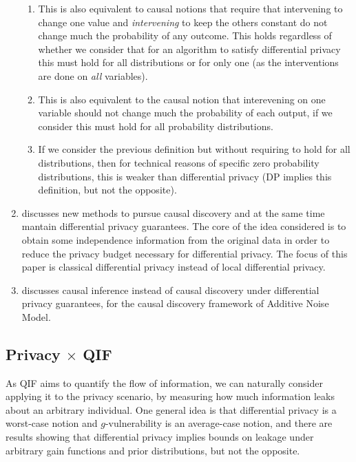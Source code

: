 \begin{enumerate}
\begin{enumerate}
    \item This is also equivalent to causal notions that require that intervening to change one value and \emph{intervening} to keep the others constant do not change much the probability of any outcome. This holds regardless of whether we consider that for an algorithm to satisfy differential privacy this must hold for all distributions or for only one (as the interventions are done on \emph{all} variables).
    \item This is also equivalent to the causal notion that interevening on one variable should not change much the probability of each output, if we consider this must hold for all probability distributions.
    \item If we consider the previous definition but without requiring to hold for all distributions, then for technical reasons of specific zero probability distributions, this is weaker than differential privacy (DP implies this definition, but not the opposite).
    \end{enumerate}
\item \cite{xu2017differential} discusses new methods to pursue causal discovery and at the same time mantain differential privacy guarantees. The core of the idea considered is to obtain some independence information from the original data in order to reduce the privacy budget necessary for differential privacy. The focus of this paper is classical differential privacy instead of local differential privacy.
\item \cite{kusner2016private} discusses causal inference instead of causal discovery under differential privacy guarantees, for the causal discovery framework of Additive Noise Model.
\end{enumerate}

\subsection{Privacy $\times$ QIF}

As QIF aims to quantify the flow of information, we can naturally consider applying it to the privacy scenario, by measuring how much information leaks about an arbitrary individual. One general idea is that differential privacy is a worst-case notion and $g$-vulnerability is an average-case notion, and there are results\cite{QIF} showing that differential privacy implies bounds on leakage under arbitrary gain functions and prior distributions, but not the opposite.

